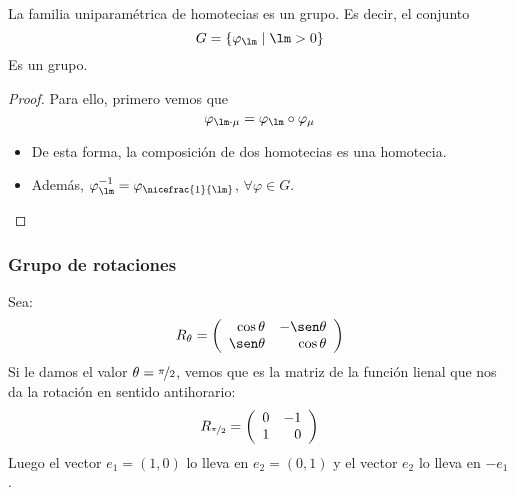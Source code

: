 \begin{prop}
    La familia uniparamétrica de homotecias es un grupo. Es decir, el conjunto
    \begin{equation*}
        G = \{\varphi_\lm \mid \lm > 0\}
    \end{equation*}
    Es un grupo.

    \begin{proof}
        Para ello, primero vemos que
        \begin{equation*}
            \varphi_{\lm \cdot \mu} = \varphi_\lm \circ \varphi_\mu
        \end{equation*}

        \begin{itemize}
            \item De esta forma, la composición de dos homotecias es una homotecia.
            \item Además, $\varphi_\lm^{-1} = \varphi_{\nicefrac{1}{\lm}}$, $\forall \varphi \in G$.
        \end{itemize}
    \end{proof}
\end{prop}

\subsubsection{Grupo de rotaciones}
Sea:
\begin{equation*}
    R_\theta = \left(\begin{array}{rr}
            \cos\theta & -\sen\theta \\
            \sen\theta & \cos\theta
    \end{array}\right)
\end{equation*}
Si le damos el valor $\theta = \nicefrac{\pi}{2}$, vemos que es la matriz de la función lienal que nos da la rotación en sentido antihorario:
\begin{equation*}
    R_{\nicefrac{\pi}{2}} = \left(\begin{array}{rr}
            0 & -1 \\
            1 & 0
    \end{array}\right)
\end{equation*}
Luego el vector $e_1=(1,0)$ lo lleva en $e_2=(0,1)$ y el vector $e_2$ lo lleva en $-e_1$.

